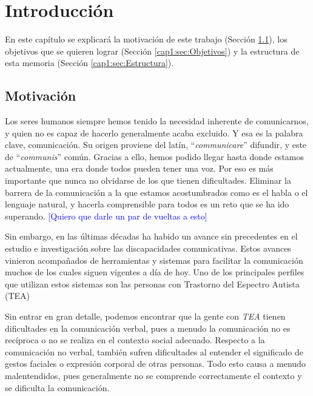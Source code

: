 \chapter{Introducción}
\label{cap:introduccion}


\begin{resumen} En este capítulo se explicará la motivación de este trabajo (Sección \ref{cap1:sec:Motivacion}), los objetivos que se quieren lograr (Sección \ref{cap1:sec:Objetivos}) y la estructura de esta memoria (Sección \ref{cap1:sec:Estructura}). 
\end{resumen}
\section{Motivación}
\label{cap1:sec:Motivacion}

Los seres humanos siempre hemos tenido la necesidad inherente de comunicarnos, y quien no es capaz de hacerlo generalmente acaba excluido. Y esa es la palabra clave, comunicación. Su origen proviene del latín, “\textit{communicare}” difundir, y este de “\textit{communis}” común. Gracias a ello, hemos podido llegar hasta donde estamos actualmente, una era donde todos pueden tener una voz. Por eso es más importante que nunca no olvidarse de los que tienen dificultades. Eliminar la barrera de la comunicación a la que estamos acostumbrados como es el habla o el lenguaje natural, y hacerla comprensible para todos es un reto que se ha ido superando. \textcolor{blue}{[Quiero que darle un par de vueltas a esto]}

Sin embargo, en las últimas décadas ha habido un avance sin precedentes en el estudio e investigación sobre las discapacidades comunicativas. Estos avances vinieron acompañados de herramientas y sistemas para facilitar la comunicación muchos de los cuales siguen vigentes a día de hoy. Uno de los principales perfiles que utilizan estos sistemas son las  personas con Trastorno del Espectro Autista (TEA)

Sin entrar en gran detalle, podemos encontrar que la gente con \textit{TEA} tienen dificultades en la comunicación verbal, pues a menudo la comunicación no es recíproca o no se realiza en el contexto social adecuado. Respecto a la comunicación no verbal, también sufren dificultades al entender el significado de gestos faciales o expresión corporal de otras personas. Todo esto causa a menudo malentendidos, pues generalmente no se comprende correctamente el contexto y se dificulta la comunicación. 

